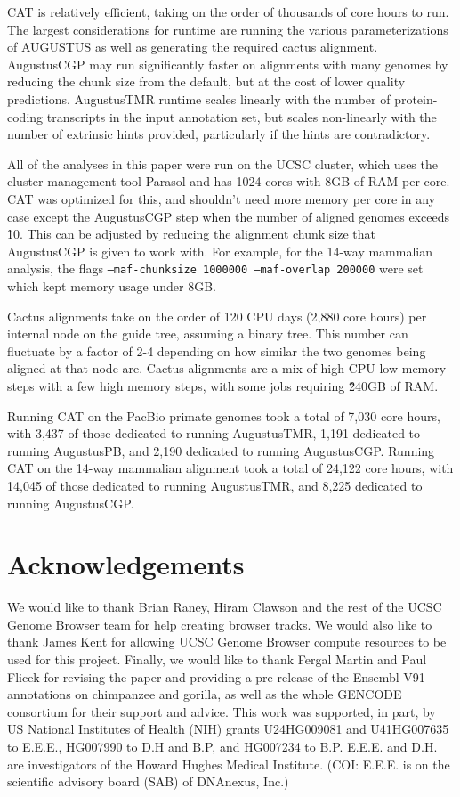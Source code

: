 \documentclass[fleqn,10pt]{wlscirep}
\begin{document}
CAT is relatively efficient, taking on the order of thousands of core hours to run. The largest considerations for runtime are running the various parameterizations of AUGUSTUS as well as generating the required cactus alignment. AugustusCGP may run significantly faster on alignments with many genomes by reducing the chunk size from the default, but at the cost of lower quality predictions. AugustusTMR runtime scales linearly with the number of protein-coding transcripts in the input annotation set, but scales non-linearly with the number of extrinsic hints provided, particularly if the hints are contradictory. 

All of the analyses in this paper were run on the UCSC cluster, which uses the cluster management tool Parasol and has 1024 cores with 8GB of RAM per core. CAT was optimized for this, and shouldn't need more memory per core in any case except the AugustusCGP step when the number of aligned genomes exceeds \~10. This can be adjusted by reducing the alignment chunk size that AugustusCGP is given to work with. For example, for the 14-way mammalian analysis, the flags \texttt{--maf-chunksize 1000000 --maf-overlap 200000} were set which kept memory usage under 8GB.

Cactus alignments take on the order of 120 CPU days (2,880 core hours) per internal node on the guide tree, assuming a binary tree. This number can fluctuate by a factor of 2-4 depending on how similar the two genomes being aligned at that node are. Cactus alignments are a mix of high CPU low memory steps with a few high memory steps, with some jobs requiring \~240GB of RAM.

Running CAT on the PacBio primate genomes took a total of 7,030 core hours, with 3,437 of those dedicated to running AugustusTMR, 1,191 dedicated to running AugustusPB, and 2,190 dedicated to running AugustusCGP. Running CAT on the 14-way mammalian alignment took a total of 24,122 core hours, with 14,045 of those dedicated to running AugustusTMR, and 8,225 dedicated to running AugustusCGP.

\section*{Acknowledgements}

We would like to thank Brian Raney, Hiram Clawson and the rest of the UCSC Genome Browser team for help creating browser tracks. We would also like to thank James Kent for allowing UCSC Genome Browser compute resources to be used for this project. Finally, we would like to thank Fergal Martin and Paul Flicek for revising the paper and providing a pre-release of the Ensembl V91 annotations on chimpanzee and gorilla, as well as the whole GENCODE consortium for their support and advice. This work was supported, in part, by US National Institutes of Health (NIH) grants U24HG009081 and U41HG007635 to E.E.E., HG007990 to D.H and B.P, and HG007234 to B.P. E.E.E. and D.H. are investigators of the Howard Hughes Medical Institute. (COI: E.E.E. is on the scientific advisory board (SAB) of DNAnexus, Inc.)
\end{document}
